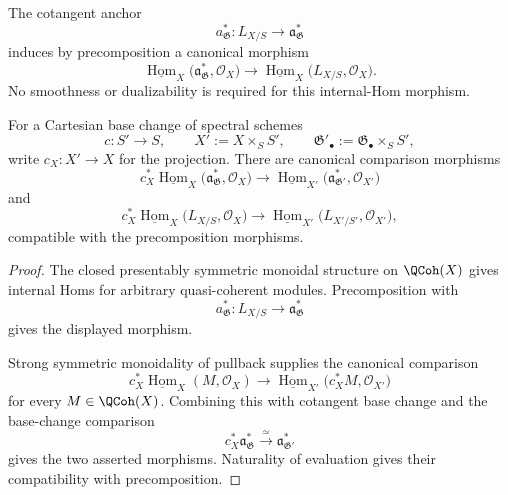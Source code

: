 \begin{theorem}
\label{thm:represented-internal-dual-anchor}
The cotangent anchor
\[
    a_{\mathfrak G}^{*}:
    L_{X/S}\longrightarrow\mathfrak a_{\mathfrak G}^{*}
\]
induces by precomposition a canonical morphism
\[
\boxed{
    \underline{\operatorname{Hom}}_X
    \bigl(
        \mathfrak a_{\mathfrak G}^{*},
        \mathcal O_X
    \bigr)
    \longrightarrow
    \underline{\operatorname{Hom}}_X
    \bigl(
        L_{X/S},
        \mathcal O_X
    \bigr).
}
\]
No smoothness or dualizability is required for this internal-Hom morphism.

For a Cartesian base change of spectral schemes
\[
    c:S'\longrightarrow S,
    \qquad
    X':=X\times_SS',
    \qquad
    \mathfrak G'_\bullet:=\mathfrak G_\bullet\times_SS',
\]
write $c_X:X'\to X$ for the projection.  There are canonical comparison
morphisms
\[
    c_X^*
    \underline{\operatorname{Hom}}_X
    \bigl(
        \mathfrak a_{\mathfrak G}^{*},
        \mathcal O_X
    \bigr)
    \longrightarrow
    \underline{\operatorname{Hom}}_{X'}
    \bigl(
        \mathfrak a_{\mathfrak G'}^{*},
        \mathcal O_{X'}
    \bigr)
\]
and
\[
    c_X^*
    \underline{\operatorname{Hom}}_X
    \bigl(
        L_{X/S},
        \mathcal O_X
    \bigr)
    \longrightarrow
    \underline{\operatorname{Hom}}_{X'}
    \bigl(
        L_{X'/S'},
        \mathcal O_{X'}
    \bigr),
\]
compatible with the precomposition morphisms.
\end{theorem}

\begin{proof}
The closed presentably symmetric monoidal structure on
$\QCoh(X)$ gives internal Homs for arbitrary quasi-coherent
modules.  Precomposition with
\[
    a_{\mathfrak G}^{*}:
    L_{X/S}\longrightarrow\mathfrak a_{\mathfrak G}^{*}
\]
gives the displayed morphism.

Strong symmetric monoidality of pullback supplies the canonical comparison
\[
    c_X^*\underline{\operatorname{Hom}}_X(M,\mathcal O_X)
    \longrightarrow
    \underline{\operatorname{Hom}}_{X'}
    \bigl(c_X^*M,\mathcal O_{X'}\bigr)
\]
for every $M\in\QCoh(X)$.  Combining this with cotangent base change and
the base-change comparison
\[
    c_X^*\mathfrak a_{\mathfrak G}^{*}
    \xrightarrow{\simeq}
    \mathfrak a_{\mathfrak G'}^{*}
\]
gives the two asserted morphisms.  Naturality of evaluation gives their
compatibility with precomposition.
\end{proof}

